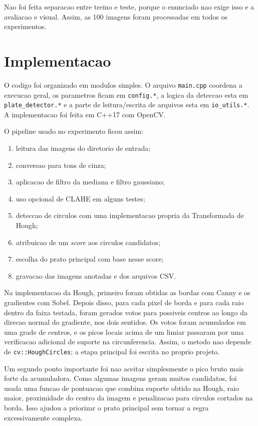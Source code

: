 \documentclass[12pt,a4paper]{article}
\begin{document}
Nao foi feita separacao entre treino e teste, porque o enunciado nao exige isso e a avaliacao e visual. Assim, as 100 imagens foram processadas em todos os experimentos.

\section{Implementacao}

O codigo foi organizado em modulos simples. O arquivo \texttt{main.cpp} coordena a execucao geral, os parametros ficam em \texttt{config.*}, a logica da deteccao esta em \texttt{plate\_detector.*} e a parte de leitura/escrita de arquivos esta em \texttt{io\_utils.*}. A implementacao foi feita em C++17 com OpenCV.

O pipeline usado no experimento ficou assim:

\begin{enumerate}
    \item leitura das imagens do diretorio de entrada;
    \item conversao para tons de cinza;
    \item aplicacao de filtro da mediana e filtro gaussiano;
    \item uso opcional de CLAHE em alguns testes;
    \item deteccao de circulos com uma implementacao propria da Transformada de Hough;
    \item atribuicao de um \emph{score} aos circulos candidatos;
    \item escolha do prato principal com base nesse score;
    \item gravacao das imagens anotadas e dos arquivos CSV.
\end{enumerate}

Na implementacao da Hough, primeiro foram obtidas as bordas com Canny e os gradientes com Sobel. Depois disso, para cada pixel de borda e para cada raio dentro da faixa testada, foram gerados votos para possiveis centros ao longo da direcao normal do gradiente, nos dois sentidos. Os votos foram acumulados em uma grade de centros, e os picos locais acima de um limiar passaram por uma verificacao adicional de suporte na circunferencia. Assim, o metodo nao depende de \texttt{cv::HoughCircles}; a etapa principal foi escrita no proprio projeto.

Um segundo ponto importante foi nao aceitar simplesmente o pico bruto mais forte da acumuladora. Como algumas imagens geram muitos candidatos, foi usada uma funcao de pontuacao que combina suporte obtido na Hough, raio maior, proximidade do centro da imagem e penalizacao para circulos cortados na borda. Isso ajudou a priorizar o prato principal sem tornar a regra excessivamente complexa.
\end{document}
